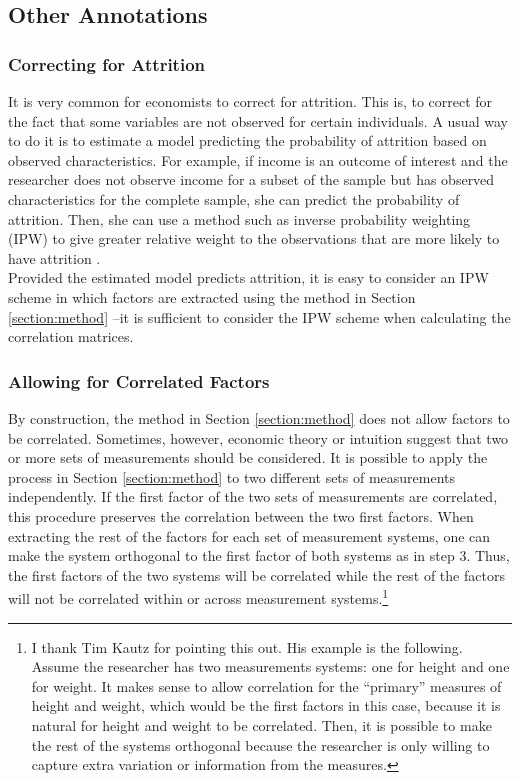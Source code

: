 \subsection{Other Annotations}

\subsubsection{Correcting for Attrition}
\noindent It is very common for economists to correct for attrition. This is, to correct for the fact that some variables are not observed for certain individuals. A usual way to do it is to estimate a model predicting the probability of attrition based on observed characteristics. For example, if income is an outcome of interest and the researcher does not observe income for a subset of the sample but has observed characteristics for the complete sample, she can predict the probability of attrition. Then, she can use a method such as inverse probability weighting (IPW) to give greater relative weight to the observations that are more likely to have attrition \citep[see][]{wooldridge2007inverse}.\\
\indent Provided the estimated model predicts attrition, it is easy to consider an IPW scheme in which factors are extracted using the method in Section \ref{section:method} --it is sufficient to consider the IPW scheme when calculating the correlation matrices.

\subsubsection{Allowing for Correlated Factors} \label{section:correlated}
\noindent By construction, the method in Section \ref{section:method} does not allow factors to be correlated. Sometimes, however, economic theory or intuition suggest that two or more sets of measurements should be considered. It is possible to apply the process in Section \ref{section:method} to two different sets of measurements independently. If the first factor of the two sets of measurements are correlated, this procedure preserves the correlation between the two first factors. When extracting the rest of the factors for each set of measurement systems, one can make the system orthogonal to the first factor of both systems as in step 3. Thus, the first factors of the two systems will be correlated while the rest of the factors will not be correlated within or across measurement systems.\footnote{I thank Tim Kautz for pointing this out. His example is the following. Assume the researcher has two measurements systems: one for height and one for weight. It makes sense to allow correlation for the ``primary'' measures of height and weight, which would be the first factors in this case, because it is natural for height and weight to be correlated. Then, it is possible to make the rest of the systems orthogonal because the researcher is only willing to capture extra variation or information from the measures.}